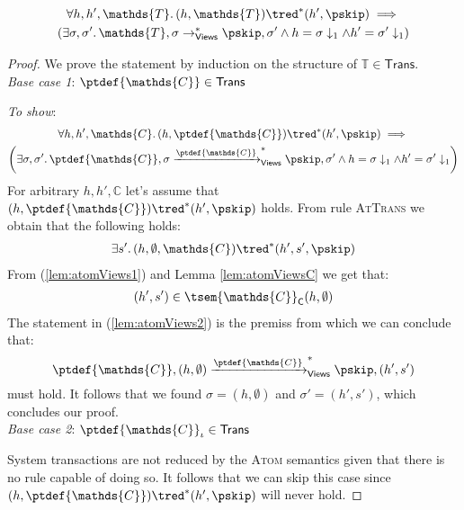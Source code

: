 \begin{lem}
	\label{lem:atomViews}
	\begin{gather*}
		\forall h, h', \mathds{T} \ldotp
		(h, \mathds{T}) \tred^* (h', \pskip)
		\implies \\
		\left(		
			\exists \sigma, \sigma' \ldotp
			\mathds{T}, \sigma \rightarrow^*_{\mathsf{Views}} \pskip, \sigma'
			\land h = \sigma \downarrow_1 \land h' = \sigma' \downarrow_1
		\right)
	\end{gather*}
	{\parindent0pt
	\begin{proof}
	We prove the statement by induction on the structure of $\mathds{T} \in \mathsf{Trans}$. \\
	\indline
	\textit{Base case 1}: $\ptdef{\mathds{C}} \in \mathsf{Trans}$
	
	\textit{To show}:
	\begin{gather*}
		\forall h, h', \mathds{C} \ldotp
		(h, \ptdef{\mathds{C}}) \tred^* (h', \pskip)
		\implies \\
		\left(		
			\exists \sigma, \sigma' \ldotp
			\ptdef{\mathds{C}}, \sigma \xrightarrow{\ptdef{\mathds{C}}}^*_{\mathsf{Views}} \pskip, \sigma'
			\land h = \sigma \downarrow_1 \land h' = \sigma' \downarrow_1
		\right)
	\end{gather*}
	For arbitrary $h, h', \mathds{C}$ let's assume that $(h, \ptdef{\mathds{C}}) \tred^* (h', \pskip)$ holds. From rule \textsc{AtTrans} we obtain that the following holds:
	\begin{gather}
		\label{lem:atomViews1}
		\exists s' \ldotp
		(h, \emptyset, \mathds{C}) \tred^* (h', s', \pskip)
	\end{gather}
	From (\ref{lem:atomViews1}) and Lemma \ref{lem:atomViewsC} we get that:
	\begin{gather}
		\label{lem:atomViews2}
		(h', s') \in \tsem{\mathds{C}}_\mathsf{C}(h, \emptyset)
	\end{gather}
	The statement in (\ref{lem:atomViews2}) is the premiss from which we can conclude that:
	\[
		\ptdef{\mathds{C}}, (h, \emptyset) \xrightarrow{\ptdef{\mathds{C}}}^*_{\mathsf{Views}} \pskip, (h', s')
	\]
	must hold. It follows that we found $\sigma = (h, \emptyset)$ and $\sigma' = (h', s')$, which concludes our proof.
	\\	
	\indline
	\textit{Base case 2}: $\ptdef{\mathds{C}}_\iota \in \mathsf{Trans}$
	
	System transactions are not reduced by the \textsc{Atom} semantics given that there is no rule capable of doing so. It follows that we can skip this case since $(h, \ptdef{\mathds{C}}) \tred^* (h', \pskip)$ will never hold.
	\end{proof}
	}
\end{lem}

